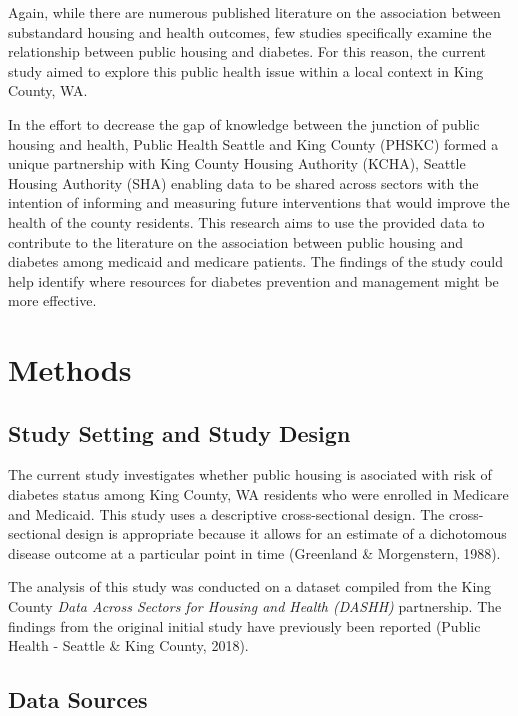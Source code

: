 \documentclass [11pt, proquest] {uwthesis}[2015/03/03]
\begin{document}
Again, while there are numerous published literature on the association
between substandard housing and health outcomes, few studies
specifically examine the relationship between public housing and
diabetes. For this reason, the current study aimed to explore this
public health issue within a local context in King County, WA.

In the effort to decrease the gap of knowledge between the junction of
public housing and health, Public Health Seattle and King County (PHSKC)
formed a unique partnership with King County Housing Authority (KCHA),
Seattle Housing Authority (SHA) enabling data to be shared across
sectors with the intention of informing and measuring future
interventions that would improve the health of the county residents.
This research aims to use the provided data to contribute to the
literature on the association between public housing and diabetes among
medicaid and medicare patients. The findings of the study could help
identify where resources for diabetes prevention and management might be
more effective.

\chapter{Methods}\label{methods}

\section{Study Setting and Study
Design}\label{study-setting-and-study-design}

The current study investigates whether public housing is asociated with
risk of diabetes status among King County, WA residents who were
enrolled in Medicare and Medicaid. This study uses a descriptive
cross-sectional design. The cross-sectional design is appropriate
because it allows for an estimate of a dichotomous disease outcome at a
particular point in time (Greenland \& Morgenstern, 1988).

The analysis of this study was conducted on a dataset compiled from the
King County \emph{Data Across Sectors for Housing and Health (DASHH)}
partnership. The findings from the original initial study have
previously been reported (Public Health - Seattle \& King County, 2018).

\section{Data Sources}\label{data-sources}
\end{document}
